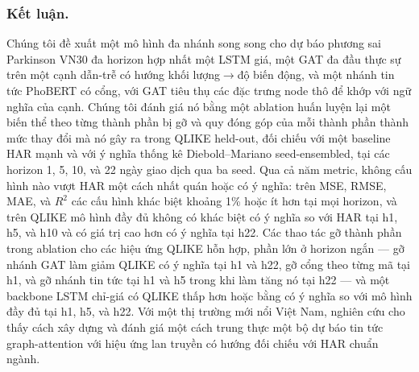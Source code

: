 \documentclass[runningheads]{llncs}
\begin{document}
\subsubsection{Kết luận.}
Chúng tôi đề xuất một mô hình đa nhánh song song cho dự báo phương sai Parkinson VN30 đa horizon hợp nhất
một LSTM giá, một GAT đa đầu thực sự trên một cạnh dẫn-trễ có hướng khối lượng$\to$độ biến động, và một
nhánh tin tức PhoBERT có cổng, với GAT tiêu thụ các đặc trưng node thô để khớp với ngữ nghĩa của cạnh.
Chúng tôi đánh giá nó bằng một ablation huấn luyện lại một biến thể theo từng thành phần bị gỡ và quy đóng
góp của mỗi thành phần thành mức thay đổi mà nó gây ra trong QLIKE held-out, đối chiếu với một baseline
HAR mạnh và với ý nghĩa thống kê Diebold--Mariano seed-ensembled, tại các horizon 1, 5, 10, và 22 ngày
giao dịch qua ba seed. Qua cả năm metric, không cấu hình nào vượt HAR một cách nhất quán hoặc có ý nghĩa:
trên MSE, RMSE, MAE, và $R^2$ các cấu hình khác biệt khoảng 1\% hoặc ít hơn tại mọi horizon, và trên
QLIKE mô hình đầy đủ không có khác biệt có ý nghĩa so với HAR tại h1, h5, và h10 và có giá trị cao hơn có
ý nghĩa tại h22. Các thao tác gỡ thành phần trong ablation cho các hiệu ứng QLIKE hỗn hợp, phần lớn ở
horizon ngắn --- gỡ nhánh GAT làm giảm QLIKE có ý nghĩa tại h1 và h22, gỡ cổng theo từng mã tại h1, và gỡ
nhánh tin tức tại h1 và h5 trong khi làm tăng nó tại h22 --- và một backbone LSTM chỉ-giá có QLIKE thấp
hơn hoặc bằng có ý nghĩa so với mô hình đầy đủ tại h1, h5, và h22. Với một thị trường mới nổi Việt Nam, nghiên
cứu cho thấy cách xây dựng và đánh giá một cách trung thực một bộ dự báo tin tức graph-attention với hiệu
ứng lan truyền có hướng đối chiếu với HAR chuẩn ngành.
\end{document}
